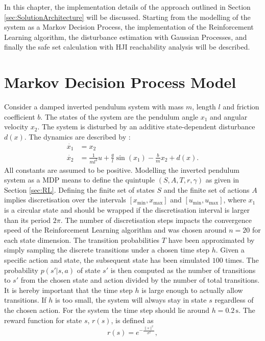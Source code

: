 \documentclass[../main.tex]{subfiles}
\begin{document}
In this chapter, the implementation details of the approach outlined in Section \ref{sec:SolutionArchitecture} will be discussed. Starting from the modelling of the system as a Markov Decision Process, the implementation of the Reinforcement Learning algorithm, the disturbance estimation with Gaussian Processes, and finally the safe set calculation with HJI reachability analysis will be described.
\section{Markov Decision Process Model}\label{sec:implementation_MDP}
Consider a damped inverted pendulum system with mass $m$, length $l$ and friction coefficient $b$. The states of the system are the pendulum angle $x_1$ and angular velocity $x_2$. The system is disturbed by an additive state-dependent disturbance $d(x)$. The dynamics are described by \cite{doya2000reinforcement}:
\begin{align}
    \dot{x_1} &= x_2\\
    \dot{x_2} &= \frac{1}{ml^2}u+\frac{g}{l}\sin(x_1)-\frac{b}{m}x_2+d(x).
\end{align}
All constants are assumed to be positive. 
Modelling the inverted pendulum system as a MDP means to define the quintuple $(S,A,T,r,\gamma)$ as given in Section \ref{sec:RL}. Defining the finite set of states $S$ and the finite set of actions $A$ implies discretisation over the intervals $[x_{\min}, x_{\max}]$ and $[u_{\min}, u_{\max}]$, where $x_1$ is a circular state and should be wrapped if the discretisation interval is larger than its period $2\pi$. The number of discretisation  steps impacts the convergence speed of the Reinforcement Learning algorithm and was chosen around $n = 20$ for each state dimension.
The transition probabilities $T$ have been approximated by simply sampling the discrete transitions under a chosen time step $h$. Given a specific action and state, the subsequent state has been simulated $100$ times. The probability $p(s'|s,a)$ of state $s'$ is then computed as the number of transitions to $s'$ from the chosen state and action divided by the number of total transitions. It is hereby important that the time step $h$ is large enough to actually allow transitions. If $h$ is too small, the system will always stay in state $s$ regardless of the chosen action. For the system the time step should lie around $h = 0.2\,\text{s}$. The reward function for state $s$, $r(s)$, is defined as
\begin{equation}
    r(s) = e^{-\frac{\|s\|^2}{\sigma^2}},
\end{equation}
\end{document}
